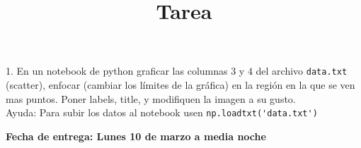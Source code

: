 \documentclass[12pt]{article}
\title{Tarea}
\begin{document}
\maketitle

1. En un notebook de python graficar las columnas $3$ y $4$ del archivo \verb"data.txt" (scatter), enfocar (cambiar los l\'imites de la gr\'afica) en la regi\'on en la que se ven mas puntos. Poner labels, title, y modifiquen la 
imagen a su gusto.\\


Ayuda: Para subir los datos al notebook usen \verb"np.loadtxt('data.txt')"

\textbf{Fecha de entrega: Lunes 10 de marzo a media noche}
\end{document}
